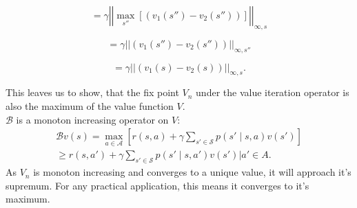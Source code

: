 \begin{equation}
= \gamma \left|\left|\max_{s''} \left[ (v_1(s'') - v_2(s''))\right]\right|\right|_{\infty, s}
\end{equation}

\begin{equation}
= \gamma \left|\left|(v_1(s'') - v_2(s''))\right|\right|_{\infty, s''}
\end{equation}

\begin{equation}
= \gamma \left|\left|(v_1(s) - v_2(s))\right|\right|_{\infty, s}.
\end{equation}

This leaves us to show, that the fix point $V_n$ under the value iteration operator is also the maximum of the value function $V$.\\
$\mathcal{B}$ is a monoton increasing operator on $V$: 
\begin{equation}
    \begin{align}
        \mathcal{B}v(s) = \max_{a \in \mathcal{A}} \left[ r(s,a) + \gamma  \sum_{s' \in \mathcal{S}} p(s' \mid s,a) v(s')\right]\\
        \geq r(s,a') + \gamma  \sum_{s' \in \mathcal{S}} p(s' \mid s,a') v(s') |a' \in A.
    \end{align}
\end{equation}
As $V_n$ is monoton increasing and converges to a unique value, it will approach it's supremum. 
For any practical application, this means it converges to it's maximum.

